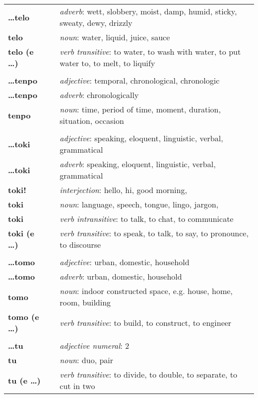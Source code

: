 \begin{supertabular}{p{2,5cm}|ll}
\textbf{\dots telo} && \textit{adverb}: wett, slobbery, moist, damp, humid, sticky, sweaty, dewy, drizzly \\ 
\textbf{telo} && \textit{noun}: water, liquid, juice, sauce \\ 
\textbf{telo (e \dots)} && \textit{verb transitive}: to water, to wash with water, to put water to, to melt, to liquify \\ 
 && \\ %
\textbf{\dots tenpo} && \textit{adjective}: temporal, chronological, chronologic \\ 
\textbf{\dots tenpo} && \textit{adverb}: chronologically \\ 
\textbf{tenpo} && \textit{noun}: time, period of time, moment, duration, situation, occasion \\ 
 && \\ %
\textbf{\dots toki} && \textit{adjective}: speaking, eloquent, linguistic, verbal, grammatical \\ 
\textbf{\dots toki} && \textit{adverb}: speaking, eloquent, linguistic, verbal, grammatical \\ 
\textbf{toki!} && \textit{interjection}: hello, hi, good morning, \\ 
\textbf{toki} && \textit{noun}: language, speech, tongue, lingo, jargon, \\ 
\textbf{toki} && \textit{verb intransitive}: to talk, to chat, to communicate \\ 
\textbf{toki (e \dots)} && \textit{verb transitive}: to speak, to talk, to say, to pronounce, to discourse \\ 
 && \\ %
\textbf{\dots tomo} && \textit{adjective}: urban, domestic, household \\ 
\textbf{\dots tomo} && \textit{adverb}: urban, domestic, household \\ 
\textbf{tomo} && \textit{noun}: indoor constructed space, e.g. house, home, room, building \\ 
\textbf{tomo (e \dots)} && \textit{verb transitive}: to build, to construct, to engineer \\ 
 && \\ %
\textbf{\dots tu} && \textit{adjective numeral}: 2 \\ 
\textbf{tu} && \textit{noun}: duo, pair \\ 
\textbf{tu (e \dots)} && \textit{verb transitive}: to divide, to double, to separate, to cut in two \\ 

\end{supertabular}
